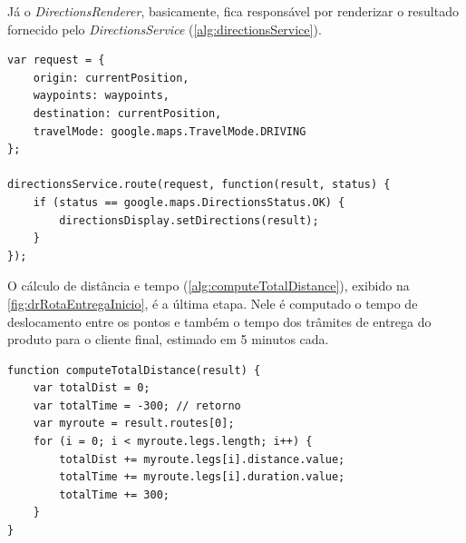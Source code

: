 Já o \textit{DirectionsRenderer}, basicamente, fica responsável por renderizar o resultado fornecido pelo \textit{DirectionsService} (\autoref{alg:directionsService}).

\begin{lstlisting}[caption={Delivery Routes - Requisição de renderização do mapa}, style=htmlcssjs, label=alg:directionsService]
var request = {
    origin: currentPosition,
    waypoints: waypoints,
    destination: currentPosition,
    travelMode: google.maps.TravelMode.DRIVING
};

directionsService.route(request, function(result, status) {
    if (status == google.maps.DirectionsStatus.OK) {
        directionsDisplay.setDirections(result);
    }
});
\end{lstlisting}

O cálculo de distância e tempo (\autoref{alg:computeTotalDistance}), exibido na \autoref{fig:drRotaEntregaInicio}, é a última etapa. Nele é computado o tempo de deslocamento entre os pontos e também o tempo dos trâmites de entrega do produto para o cliente final, estimado em 5 minutos cada.

\begin{lstlisting}[caption={Delivery Routes - Função de cálculo do deslocamento}, style=htmlcssjs, label=alg:computeTotalDistance]
function computeTotalDistance(result) {
    var totalDist = 0;
    var totalTime = -300; // retorno
    var myroute = result.routes[0];
    for (i = 0; i < myroute.legs.length; i++) {
        totalDist += myroute.legs[i].distance.value;
        totalTime += myroute.legs[i].duration.value;
        totalTime += 300;
    }
}
\end{lstlisting}